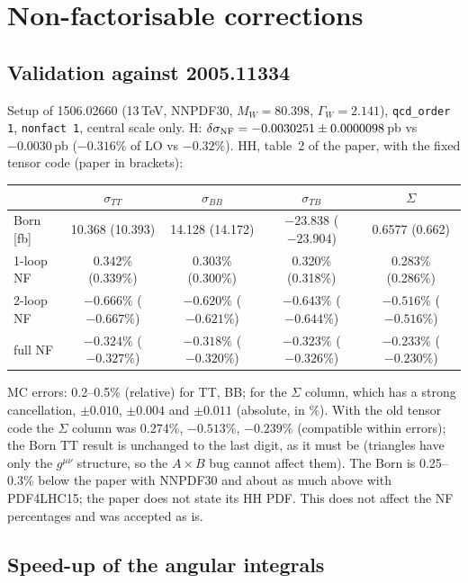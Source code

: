 \documentclass[11pt,a4paper]{article}
\begin{document}
\section{Non-factorisable corrections}

\subsection{Validation against 2005.11334}

Setup of 1506.02660 (13\,TeV, NNPDF30, $M_W=80.398$, $\Gamma_W=2.141$),
\texttt{qcd\_order 1}, \texttt{nonfact 1}, central scale only. H:
$\delta\sigma_{\rm NF}=-0.0030251\pm0.0000098$\,pb vs $-0.0030$\,pb
($-0.316\%$ of LO vs $-0.32\%$). HH, table~2 of the paper, with the
fixed tensor code (paper in brackets):

\begin{center}
\small\setlength{\tabcolsep}{4pt}
\begin{tabular}{lcccc}
\toprule
 & $\sigma_{TT}$ & $\sigma_{BB}$ & $\sigma_{TB}$ & $\Sigma$\\
\midrule
Born [fb] & 10.368 (10.393) & 14.128 (14.172) & $-23.838$ ($-23.904$) & 0.6577 (0.662)\\
1-loop NF & 0.342\% (0.339\%) & 0.303\% (0.300\%) & 0.320\% (0.318\%) & 0.283\% (0.286\%)\\
2-loop NF & $-0.666\%$ ($-0.667\%$) & $-0.620\%$ ($-0.621\%$) & $-0.643\%$ ($-0.644\%$) & $-0.516\%$ ($-0.516\%$)\\
full NF   & $-0.324\%$ ($-0.327\%$) & $-0.318\%$ ($-0.320\%$) & $-0.323\%$ ($-0.326\%$) & $-0.233\%$ ($-0.230\%$)\\
\bottomrule
\end{tabular}
\end{center}

\noindent MC errors: 0.2--0.5\% (relative) for TT, BB; for the
$\Sigma$ column, which has a strong cancellation, $\pm0.010$, $\pm0.004$
and $\pm0.011$ (absolute, in \%). With the old tensor code the
$\Sigma$ column was 0.274\%, $-0.513\%$, $-0.239\%$ (compatible within
errors); the Born TT result is unchanged to the last digit, as it must
be (triangles have only the $g^{\mu\nu}$ structure, so the $A\times B$
bug cannot affect them). The Born is 0.25--0.3\% below the paper with
NNPDF30 and about as much above with PDF4LHC15; the paper does not
state its HH PDF. This does not affect the NF percentages and was
accepted as is.

\subsection{Speed-up of the angular integrals}
\end{document}
